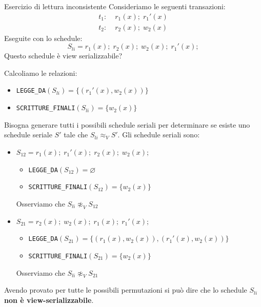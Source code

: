 \documentclass[a4paper]{article}
\begin{document}
\begin{Example}{Esercizio di lettura inconsistente}
  Consideriamo le seguenti transazioni:
  \[
  \begin{aligned}
    t_1:\; & r_1(x); \; r_1'(x) \\
    t_2:\; & r_2(x); \; w_2(x)
  \end{aligned}
  \]
  Eseguite con lo schedule:
  \[
    S_{li} = r_1(x); \; r_2(x); \; w_2(x); \; r_1'(x);
  \]
  Questo schedule è view serializzabile?

  \vspace{1em}
  \noindent
  Calcoliamo le relazioni:
  \begin{itemize}
    \item \texttt{LEGGE\_DA}\( (S_{li}) = \{ (r_1'(x), w_2(x)) \} \)
    \item \texttt{SCRITTURE\_FINALI}\( (S_{li}) = \{ w_2(x) \} \)
  \end{itemize}

  \vspace{1em}
  \noindent
  Bisogna generare tutti i possibili schedule seriali per determinare se
  esiste uno schedule seriale \( S' \) tale che \( S_{li} \approx_V S' \).
  Gli schedule seriali sono:
  \begin{itemize}
    \item \( S_{12} = r_1(x); \; r_1'(x); \; r_2(x); \; w_2(x); \)
      \begin{itemize}
        \item \texttt{LEGGE\_DA}\( (S_{12}) = \varnothing \)
        \item \texttt{SCRITTURE\_FINALI}\( (S_{12}) = \{ w_2(x) \} \)
      \end{itemize}
      Osserviamo che \( S_{li} \not\approx_V S_{12} \)

    \item \( S_{21} = r_2(x); \; w_2(x); \; r_1(x); \; r_1'(x);\,\)
      \begin{itemize}
        \item \texttt{LEGGE\_DA}\( (S_{21}) = \{ (r_1(x), w_2(x)), (r_1'(x), w_2(x)) \} \)
        \item \texttt{SCRITTURE\_FINALI}\( (S_{21}) = \{ w_2(x) \} \)
      \end{itemize}
      Osserviamo che \( S_{li} \not\approx_V S_{21} \)
  \end{itemize}
  Avendo provato per tutte le possibili permutazioni si può dire che lo schedule
  \( S_{li} \) \textbf{non è view-serializzabile}.
\end{Example}
\end{document}
